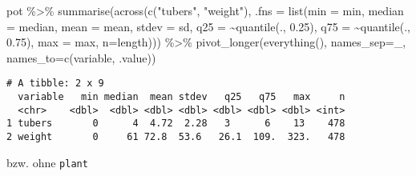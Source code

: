 \documentclass[
  letterpaper,
  DIV=11,
  numbers=noendperiod]{scrartcl}
\newenvironment{Shaded}{\begin{snugshade}}{\end{snugshade}}
\newcommand{\AttributeTok}[1]{\textcolor[rgb]{0.40,0.45,0.13}{#1}}
\newcommand{\FloatTok}[1]{\textcolor[rgb]{0.68,0.00,0.00}{#1}}
\newcommand{\FunctionTok}[1]{\textcolor[rgb]{0.28,0.35,0.67}{#1}}
\newcommand{\NormalTok}[1]{\textcolor[rgb]{0.00,0.23,0.31}{#1}}
\newcommand{\SpecialCharTok}[1]{\textcolor[rgb]{0.37,0.37,0.37}{#1}}
\newcommand{\StringTok}[1]{\textcolor[rgb]{0.13,0.47,0.30}{#1}}
\begin{document}
\begin{Shaded}
\begin{Highlighting}[]
\NormalTok{pot }\SpecialCharTok{\%\textgreater{}\%} \FunctionTok{summarise}\NormalTok{(}\FunctionTok{across}\NormalTok{(}\FunctionTok{c}\NormalTok{(}\StringTok{"tubers"}\NormalTok{, }\StringTok{"weight"}\NormalTok{), }\AttributeTok{.fns =} 
                     \FunctionTok{list}\NormalTok{(}\AttributeTok{min =}\NormalTok{ min,}
                          \AttributeTok{median =}\NormalTok{ median,}
                          \AttributeTok{mean =}\NormalTok{ mean,}
                          \AttributeTok{stdev =}\NormalTok{ sd,}
                          \AttributeTok{q25 =} \SpecialCharTok{\textasciitilde{}}\FunctionTok{quantile}\NormalTok{(., }\FloatTok{0.25}\NormalTok{),}
                          \AttributeTok{q75 =} \SpecialCharTok{\textasciitilde{}}\FunctionTok{quantile}\NormalTok{(., }\FloatTok{0.75}\NormalTok{),}
                          \AttributeTok{max =}\NormalTok{ max, }
                          \AttributeTok{n=}\NormalTok{length))) }\SpecialCharTok{\%\textgreater{}\%}
  \FunctionTok{pivot\_longer}\NormalTok{(}\FunctionTok{everything}\NormalTok{(), }\AttributeTok{names\_sep=}\StringTok{\textquotesingle{}\_\textquotesingle{}}\NormalTok{, }\AttributeTok{names\_to=}\FunctionTok{c}\NormalTok{(}\StringTok{\textquotesingle{}variable\textquotesingle{}}\NormalTok{, }\StringTok{\textquotesingle{}.value\textquotesingle{}}\NormalTok{))}
\end{Highlighting}
\end{Shaded}

\begin{verbatim}
# A tibble: 2 x 9
  variable   min median  mean stdev   q25   q75   max     n
  <chr>    <dbl>  <dbl> <dbl> <dbl> <dbl> <dbl> <dbl> <int>
1 tubers       0      4  4.72  2.28   3      6    13    478
2 weight       0     61 72.8  53.6   26.1  109.  323.   478
\end{verbatim}

bzw. ohne \texttt{plant}
\end{document}
